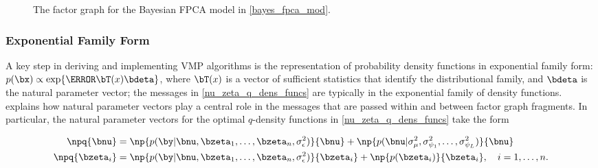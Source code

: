 \documentclass[ba]{imsart}
\numberwithin{equation}{section}
\theoremstyle{plain}
\def\sigsqeps{\sigma^2_{\epsilon}}
\def\sigsqmu{\sigma^2_{\mu}}
\newcommand\sigsqpsi[1]{\sigma^2_{\psi_{#1}}}
\begin{document}
\begin{figure}
\caption{The factor graph for the Bayesian FPCA model in \eqref{bayes_fpca_mod}.}
\label{fig:fg_fpca}
\end{figure}


\subsubsection{Exponential Family Form}
\label{sec:exp_fam_form}

A key step in deriving and implementing VMP algorithms is the representation of probability density functions
in exponential family form: $p (\bx) \propto \exp \{ \T{\bT(x)} \bdeta \}$, where $\bT (x)$ is a vector of sufficient
statistics that identify the distributional family, and $\bdeta$ is the natural parameter vector;
the messages in \eqref{nu_zeta_q_dens_funcs} are typically in the exponential family of density functions.
\citet{wand17} explains how natural parameter vectors play a central role in the messages that are
passed within and between factor graph fragments. In particular, the natural parameter vectors for the
optimal $q$-density functions in \eqref{nu_zeta_q_dens_funcs} take the form

\begin{align}
\begin{split}
	\npq{\bnu} &=
		\np{p (\by | \bnu, \bzeta_1, \dots, \bzeta_n, \sigsqeps)}{\bnu} +
		\np{p (\bnu | \sigsqmu, \sigsqpsi{1}, \dots, \sigsqpsi{L})}{\bnu} \\
	\npq{\bzeta_i} &=
		\np{p (\by | \bnu, \bzeta_1, \dots, \bzeta_n, \sigsqeps)}{\bzeta_i} +
		\np{p (\bzeta_i)}{\bzeta_i} , \quad i = 1, \dots, n.
\end{split}
\label{etaq}
\end{align}
\end{document}
